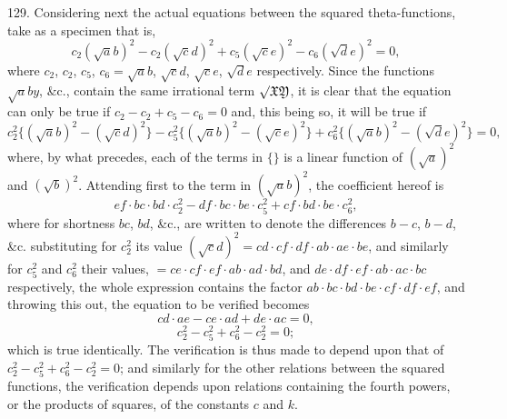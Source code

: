 \documentclass[12pt]{article}
\theoremstyle{plain}
\begin{document}
129. Considering next the actual equations between the squared theta-functions, take as a specimen that is,
\[
c_2 (\surd ab)^2 - c_2 (\surd cd)^2 + c_5 (\surd ce)^2 - c_6 (\surd de)^2 = 0,
\]
where $c_2$, $c_2$, $c_5$, $c_6 = \surd ab$, $\surd cd$, $\surd ce$, $\surd de$ respectively. Since the functions $\surd aby$, \&c., contain the same irrational term $\surd\mathfrak{XY}$, it is clear that the equation can only be true if $c_2 - c_2 + c_5 - c_6 = 0$ and, this being so, it will be true if
\[
c_2^2 \{(\surd ab)^2 - (\surd cd)^2\} - c_5^2 \{(\surd ab)^2 - (\surd ce)^2\} + c_6^2 \{(\surd ab)^2 - (\surd de)^2\} = 0,
\]
where, by what precedes, each of the terms in $\{\}$ is a linear function of $(\surd a)^2$ and $(\surd b)^2$. Attending first to the term in $(\surd ab)^2$, the coefficient hereof is
\[
ef \cdot bc \cdot bd \cdot c_2^2 - df \cdot bc \cdot be \cdot c_5^2 + cf \cdot bd \cdot be \cdot c_6^2,
\]
where for shortness $bc$, $bd$, \&c., are written to denote the differences $b - c$, $b - d$, \&c. substituting for $c_2^2$ its value $(\surd cd)^2 = cd \cdot cf \cdot df \cdot ab \cdot ae \cdot be$, and similarly for $c_5^2$ and $c_6^2$ their values, $= ce \cdot cf \cdot ef \cdot ab \cdot ad \cdot bd$, and $de \cdot df \cdot ef \cdot ab \cdot ac \cdot bc$ respectively, the whole expression contains the factor $ab \cdot bc \cdot bd \cdot be \cdot cf \cdot df \cdot ef$, and throwing this out, the equation to be verified becomes
\[
cd \cdot ae - ce \cdot ad + de \cdot ac = 0,
\]
\[
c_2^2 - c_5^2 + c_6^2 - c_2^2 = 0;
\]
which is true identically. The verification is thus made to depend upon that of $c_2^2 - c_5^2 + c_6^2 - c_2^2 = 0$; and similarly for the other relations between the squared functions, the verification depends upon relations containing the fourth powers, or the products of squares, of the constants $c$ and $k$.
\end{document}
